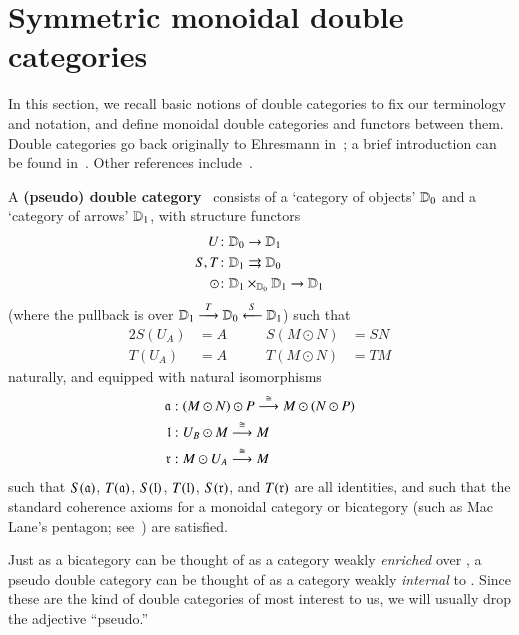 \section{Symmetric monoidal double categories}
\label{sec:symm-mono-double}

In this section, we recall basic notions of double categories to fix our terminology and notation, and define monoidal double categories and functors between them.
Double categories go back originally to Ehresmann
in~\cite{ehresmann:cat-str}; a brief introduction can be found
in~\cite{ks:r2cats}.  Other references
include~\cite{multi_funct_i,gp:double-limits,gp:double-adjoints}.


\begin{defn}
  A \textbf{(pseudo) double category} \lD\ consists of a `category of
  objects' $\lD_0$ and a `category of arrows' $\lD_1$, with structure
  functors
  \begin{align*}
    U&\maps \lD_0\to \lD_1\\
    S,T&\maps \lD_1\rightrightarrows \lD_0\\
    \odot&\maps \lD_1\times_{\lD_0}\lD_1\to \lD_1
  \end{align*}
  (where the pullback is over
  $\lD_1\too[T]\lD_0\overset{S}{\longleftarrow} \lD_1$) such that
  \begin{alignat*}{2}
    S(U_A) &= A &\qquad
    S(M\odot N) &= SN\\
    T(U_A) &= A &\qquad
    T(M\odot N) &= TM
  \end{alignat*}
  naturally, and equipped with natural isomorphisms
  \begin{align*}
    \fa &: (M\odot N) \odot P \too[\iso] M \odot (N \odot P)\\
    \fl &: U_B \odot M \too[\iso] M\\
    \fr &: M \odot U_A \too[\iso] M
  \end{align*}
  such that $S(\fa)$, $T(\fa)$, $S(\fl)$, $T(\fl)$, $S(\fr)$, and
  $T(\fr)$ are all identities, and such that the standard coherence
  axioms for a monoidal category or bicategory (such as Mac Lane's
  pentagon; see~\cite{maclane}) are satisfied.
\end{defn}

Just as a bicategory can be thought of as a category weakly
\emph{enriched} over \cCat, a pseudo double category can be thought of
as a category weakly \emph{internal} to \cCat.  Since these are the
kind of double categories of most interest to us, we will usually drop
the adjective ``pseudo.''

